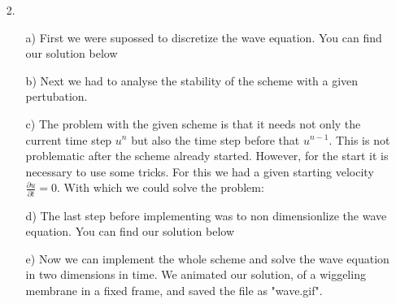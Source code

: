 \begin{itemize}
    \item[2.]
    \begin{itemize}
        In the second execerise of this sheet we were asked to solve the wave equation in two dimensions.
        \item[a)]
        First we were supossed to discretize the wave equation.
        You can find our solution below 


        \FloatBarrier
        \item[b)]
        \FloatBarrier
        Next we had to analyse the stability of the scheme with a given pertubation.

        \FloatBarrier
        \item[c)]
        \FloatBarrier
        The problem with the given scheme is that it needs not only the current time step $u^{n}$ but also the time step before that $u^{n-1}$.
        This is not problematic after the scheme already started.
        However, for the start it is necessary to use some tricks.
        For this we had a given starting velocity $\frac{\partial u}{\partial t} = 0$.
        With which we could solve the problem:


        \FloatBarrier
        \item[d)]
        \FloatBarrier
        The last step before implementing was to non dimensionlize the wave equation.
        You can find our solution below 
        \FloatBarrier
        \item[e)]
        Now we can implement the whole scheme and solve the wave equation in two dimensions in time.
        We animated our solution, of a wiggeling membrane in a fixed frame, and saved the file as "wave.gif".

    \end{itemize}
\end{itemize}



